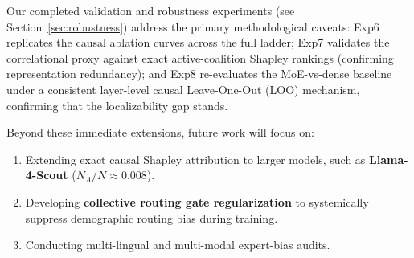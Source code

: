 \documentclass[11pt,a4paper]{article}
\begin{document}
Our completed validation and robustness experiments (see Section~\ref{sec:robustness}) address the primary methodological caveats: Exp6 replicates the causal ablation curves across the full ladder; Exp7 validates the correlational proxy against exact active-coalition Shapley rankings (confirming representation redundancy); and Exp8 re-evaluates the MoE-vs-dense baseline under a consistent layer-level causal Leave-One-Out (LOO) mechanism, confirming that the localizability gap stands.

Beyond these immediate extensions, future work will focus on:
\begin{enumerate}
    \item Extending exact causal Shapley attribution to larger models, such as \textbf{Llama-4-Scout} ($N_A/N \approx 0.008$).
    \item Developing \textbf{collective routing gate regularization} to systemically suppress demographic routing bias during training.
    \item Conducting multi-lingual and multi-modal expert-bias audits.
\end{enumerate}
\end{document}
